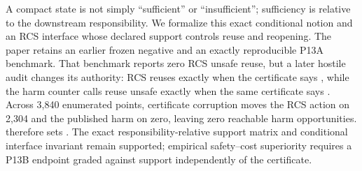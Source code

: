 \markdownRendererDocumentBegin
A compact state is not simply “sufficient” or “insufficient”; sufficiency is relative to the downstream responsibility. We formalize this exact conditional notion and an RCS interface whose declared support controls reuse and reopening. The paper retains an earlier frozen negative and an exactly reproducible P13A benchmark. That benchmark reports zero RCS unsafe reuse, but a later hostile audit changes its authority: RCS reuses exactly when the certificate says , while the harm counter calls reuse unsafe exactly when the same certificate says . Across 3,840 enumerated points, certificate corruption moves the RCS action on 2,304 and the published harm on zero, leaving zero reachable harm opportunities.  therefore sets . The exact responsibility-relative support matrix and conditional interface invariant remain supported; empirical safety–cost superiority requires a P13B endpoint graded against support independently of the certificate.\markdownRendererDocumentEnd